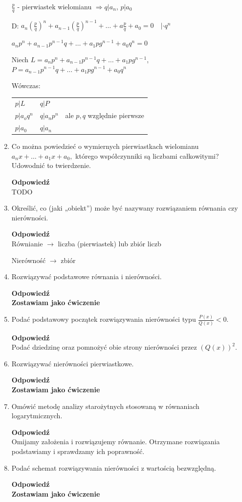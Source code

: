 \documentclass[12pt,a4paper]{article}
\newcounter{twierdzenie}
\theoremstyle{break}
\newcommand{\Odp}[1]{
		\begin{mdframed}[style=zadanie]
			\textbf{Odpowiedź}\\
			#1
		\end{mdframed}
	}
\begin{document}
\begin{enumerate}[1.]
{		$\frac{p}{q}$ - pierwiastek wielomianu $\Rightarrow q|a_n$, $p|a_0$
		
		D: $a_n(\frac{p}{q})^n+a_{n-1}(\frac{p}{q})^{n-1}+\dots+a\frac{p}{q}+a_0=0 \quad |\cdot q^n$
		
		$a_np^n+a_{n-1}p^{n-1}q+\dots+a_1pg^{n-1}+a_0q^n=0$
		
		Niech $L=a_np^n+a_{n-1}p^{n-1}q+\dots+a_1pg^{n-1}$, $P=a_{n-1}p^{n-1}q+\dots+a_1pg^{n-1}+a_0q^n$
		
		Wówczas:\\
		
		\begin{tabular}{p{4cm} p{4cm} p{5cm}}
			$p|L$ & $q|P$ &\\
			$p|a_oq^n$ & $q|a_np^n$& ale $p,q$ względnie pierwsze\\
			$p|a_0$&$q|a_n$&\\
		\end{tabular}
		
		
	}
	
	\item Co można powiedzieć o wymiernych pierwiastkach wielomianu $a_nx + \dots + a_1x + a_0,$ którego współczynniki są liczbami całkowitymi? Udowodnić to twierdzenie.
	\Odp{
		TODO
	}
	
	\item Określić, co (jaki „obiekt”) może być nazywany rozwiązaniem równania czy nierówności.
	\Odp{
		Równianie $\rightarrow$ liczba (pierwiastek) lub zbiór liczb
		
		Nierówność $\rightarrow$ zbiór
	}

	\item Rozwiązywać podstawowe równania i nierówności.
	\Odp{
		\textbf{Zostawiam jako ćwiczenie}
	}
	
	\item Podać podstawowy początek rozwiązywania nierówności typu $\frac{P(x)}{Q(x)} < 0$.
	\Odp{
		Podać dziedzinę oraz pomnożyć obie strony nierówności przez $(Q(x))^2$.
	}
	
	\item Rozwiązywać nierówności pierwiastkowe.
	\Odp{
		\textbf{Zostawiam jako ćwiczenie}
	}
	
	\item Omówić metodę analizy starożytnych stosowaną w równaniach logarytmicznych.
	\Odp{
		Omijamy założenia i rozwiązujemy równanie. Otrzymane rozwiązania podstawiamy i sprawdzamy ich poprawność.
	}
	
	\item Podać schemat rozwiązywania nierówności z wartością bezwzględną.
	\Odp{
		\textbf{Zostawiam jako ćwiczenie}
	}


\end{enumerate}
\end{document}
